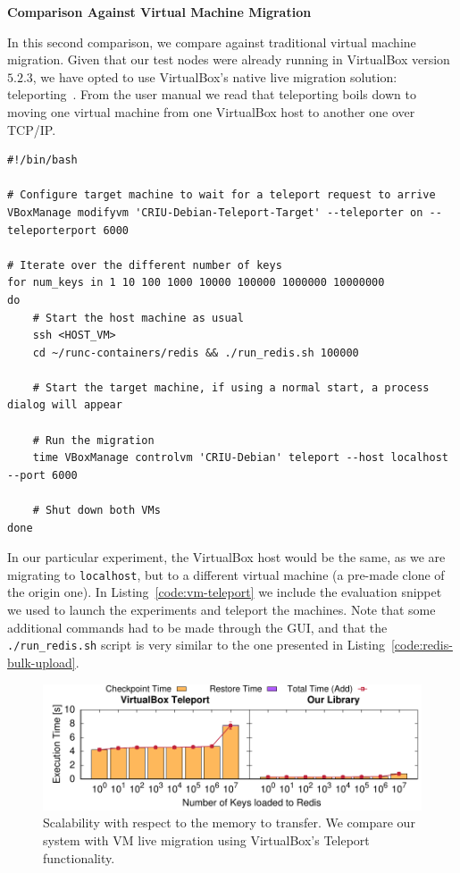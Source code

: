 \textbf{Comparison Against Virtual Machine Migration}

In this second comparison, we compare against traditional virtual machine migration.
Given that our test nodes were already running in VirtualBox version $5.2.3$, we have opted to use VirtualBox's native live migration solution: teleporting~\cite{vbox-teleport}.
From the user manual we read that teleporting boils down to moving one virtual machine from one VirtualBox host to another one over TCP/IP.

\begin{lstlisting}[style=Bash,caption={Script to teleport a VirtualBox VM, and run the macrobenchmark.},label={code:vm-teleport}]
#!/bin/bash

# Configure target machine to wait for a teleport request to arrive
VBoxManage modifyvm 'CRIU-Debian-Teleport-Target' --teleporter on --teleporterport 6000

# Iterate over the different number of keys
for num_keys in 1 10 100 1000 10000 100000 1000000 10000000
do
    # Start the host machine as usual
    ssh <HOST_VM>
    cd ~/runc-containers/redis && ./run_redis.sh 100000

    # Start the target machine, if using a normal start, a process dialog will appear

    # Run the migration
    time VBoxManage controlvm 'CRIU-Debian' teleport --host localhost --port 6000

    # Shut down both VMs
done
\end{lstlisting}

In our particular experiment, the VirtualBox  host would be the same, as we are migrating to \texttt{localhost}, but to a different virtual machine (a pre-made clone of the origin one).
In Listing~\ref{code:vm-teleport} we include the evaluation snippet we used to launch the experiments and teleport the machines.
Note that some additional commands had to be made through the GUI, and that the \texttt{./run\_redis.sh} script is very similar to the one presented in Listing~\ref{code:redis-bulk-upload}.

\begin{figure}[h!]
    \centering
    \includegraphics[width=\textwidth]{figs/vm-teleport/vm_teleport.pdf}
    \caption[Scalability comparison with VirtualBox Teleport.]{Scalability with respect to the memory to transfer. We compare our system with VM live migration using VirtualBox's Teleport functionality.\label{fig:vm-teleport}}
\end{figure}

